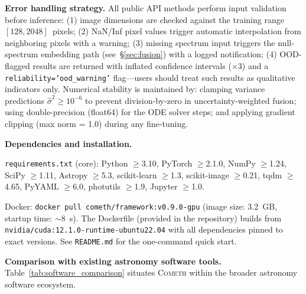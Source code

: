 \documentclass[usenatbib]{mnras}
\begin{document}
\textbf{Error handling strategy.} All public API methods perform input validation before inference: (1) image dimensions are checked against the training range $[128, 2048]$~pixels; (2) NaN/Inf pixel values trigger automatic interpolation from neighboring pixels with a warning; (3) missing spectrum input triggers the null-spectrum embedding path (see~\S\ref{sec:fusion}) with a logged notification; (4) OOD-flagged results are returned with inflated confidence intervals ($\times 3$) and a {\tt reliability='ood\_warning'} flag---users should treat such results as qualitative indicators only. Numerical stability is maintained by: clamping variance predictions $\hat{\sigma}^2 \geq 10^{-6}$ to prevent division-by-zero in uncertainty-weighted fusion; using double-precision (float64) for the ODE solver steps; and applying gradient clipping (max norm = 1.0) during any fine-tuning.

\textbf{Dependencies and installation.}

{\tt requirements.txt} (core): Python $\geq$3.10, PyTorch $\geq$2.1.0, NumPy $\geq$1.24, SciPy $\geq$1.11, Astropy $\geq$5.3, scikit-learn $\geq$1.3, scikit-image $\geq$0.21, tqdm $\geq$4.65, PyYAML $\geq$6.0, photutils $\geq$1.9, Jupyter $\geq$1.0.

Docker: {\tt docker pull cometh/framework:v0.9.0-gpu} (image size: 3.2~GB, startup time: $\sim$8~s). The Dockerfile (provided in the repository) builds from {\tt nvidia/cuda:12.1.0-runtime-ubuntu22.04} with all dependencies pinned to exact versions. See {\tt README.md} for the one-command quick start.

\textbf{Comparison with existing astronomy software tools.} Table~\ref{tab:software_comparison} situates \textsc{Cometh} within the broader astronomy software ecosystem.
\end{document}
